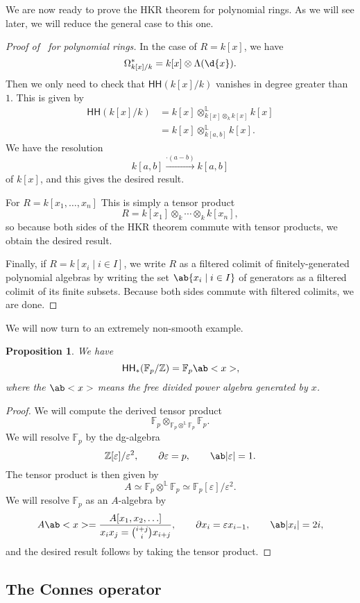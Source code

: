 \documentclass[10pt]{amsart}
\newtheorem{prop}[thm]{Proposition}
\theoremstyle{definition}
\theoremstyle{remark}
\theoremstyle{plain}
\theoremstyle{definition}
\theoremstyle{remark}
\newcommand{\Z}{\mathbb{Z}}
\newcommand{\F}{\mathbb{F}}
\renewcommand{\L}{\mathbb{L}}
\newcommand{\ep}{\varepsilon}
\newcommand{\ms}[1]{\mathsf{#1}}
\newcommand{\1}{\mathbf{1}}
\newcommand{\2}{\mathbf{2}}
\newcommand{\3}{\mathbf{3}}
\newcommand{\HH}{\ms{HH}}
\begin{document}
We are now ready to prove the HKR theorem for polynomial rings. As we will see later, we will reduce the general case to this one.
\begin{proof}[Proof of~ for polynomial rings]
    In the case of $R = k[x]$, we have
    \[ \Omega^*_{k[x]/k} = k[x] \otimes \Lambda(\d{x}). \]
    Then we only need to check that $\HH(k[x]/k)$ vanishes in degree greater than $1$. This is given by
    \begin{align*}
        \HH(k[x]/k) &= k[x] \otimes^{\L}_{k[x] \otimes_k k[x]} k[x] \\
        &= k[x] \otimes_{k[a,b]}^{\L} k[x].
    \end{align*}
    We have the resolution
    \[ k[a,b] \xrightarrow{\cdot (a-b)} k[a,b] \]
    of $k[x]$, and this gives the desired result.

    For \(R = k[x_1, \ldots, x_n]\) This is simply a tensor product
    \[ R = k[x_1] \otimes_k \cdots \otimes_k k[x_n], \]
    so because both sides of the HKR theorem commute with tensor products, we obtain the desired result.

    Finally, if \(R = k[x_i \mid i \in I]\), we write \(R\) as a filtered colimit of finitely-generated polynomial algebras by writing the set $\ab\{x_i \mid i \in I\}$ of generators as a filtered colimit of its finite subsets. Because both sides commute with filtered colimits, we are done.
\end{proof}

We will now turn to an extremely non-smooth example.
\begin{prop}
    We have
    \[ \HH_*(\F_p/\Z) = \F_p \ab<x>, \]
    where the $\ab<x>$ means the free divided power algebra generated by $x$.
\end{prop}

\begin{proof}
    We will compute the derived tensor product
    \[ \F_p \otimes_{\F_p \otimes^{\L} \F_p} \F_p. \]
    We will resolve $\F_p$ by the dg-algebra
    \[ \Z[\ep]/\ep^2, \qquad \partial \ep = p, \qquad \ab|\ep| = 1. \]
    The tensor product is then given by
    \[ A \simeq \F_p \otimes^{\L} \F_p \simeq \F_p[\ep]/\ep^2. \]
    We will resolve $\F_p$ as an $A$-algebra by
    \[ A\ab<x> = \frac{A[x_1, x_2, \ldots]}{x_ix_j = \binom{i+j}{i} x_{i+j}}, \qquad \partial x_i = \ep x_{i-1}, \qquad \ab|x_i| = 2i, \]
    and the desired result follows by taking the tensor product.
\end{proof}

\subsection{The Connes operator}%
\label{sub:The Connes operator}
\end{document}
